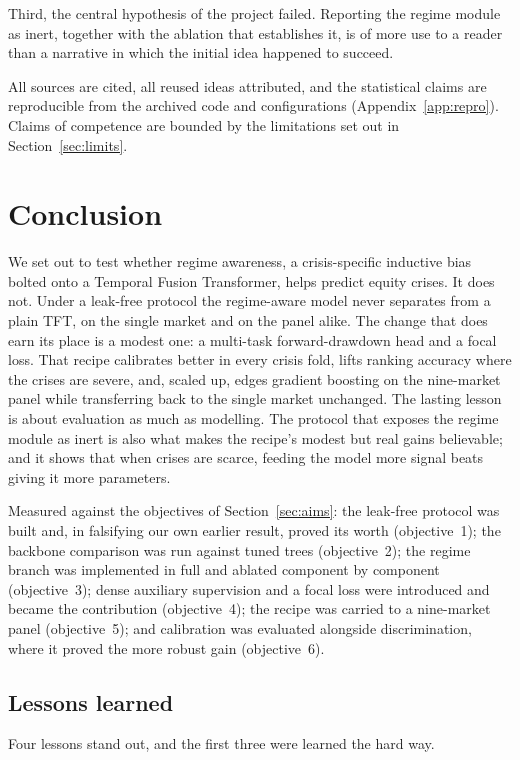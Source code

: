 \documentclass[11pt,a4paper]{article}
\begin{document}
Third, the central hypothesis of the project failed. Reporting the regime
module as inert, together with the ablation that establishes it, is of more use
to a reader than a narrative in which the initial idea happened to succeed.

All sources are cited, all reused ideas attributed, and the statistical claims
are reproducible from the archived code and configurations
(Appendix~\ref{app:repro}). Claims of competence are bounded by the limitations
set out in Section~\ref{sec:limits}.

\section{Conclusion}
\label{sec:conclusion}
We set out to test whether regime awareness, a crisis-specific inductive bias
bolted onto a Temporal Fusion Transformer, helps predict equity crises. It does
not. Under a leak-free protocol the regime-aware model never separates from a
plain TFT, on the single market and on the panel alike. The change that does
earn its place is a modest one: a multi-task forward-drawdown head and a
focal loss. That recipe
calibrates better in every crisis fold, lifts ranking accuracy where the crises
are severe, and, scaled up, edges gradient boosting on the nine-market panel
while transferring back to the single market unchanged. The lasting lesson is
about evaluation as much as modelling. The protocol that exposes the regime
module as inert is also what makes the recipe's modest but real gains
believable; and it shows that when crises are scarce, feeding the model more
signal beats giving it more parameters.

Measured against the objectives of Section~\ref{sec:aims}: the leak-free
protocol was built and, in falsifying our own earlier result, proved its worth
(objective~1); the backbone comparison was run against tuned trees
(objective~2); the regime branch was implemented in full and ablated component
by component (objective~3); dense auxiliary supervision and a focal loss were
introduced and became the contribution (objective~4); the recipe was carried to
a nine-market panel (objective~5); and calibration was evaluated alongside
discrimination, where it proved the more robust gain (objective~6).

\subsection{Lessons learned}
\label{sec:lessons}
Four lessons stand out, and the first three were learned the hard way.
\end{document}
